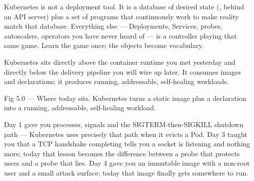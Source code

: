 \begin{keyidea}
Kubernetes is not a deployment tool. It is a database of desired state (, behind an API server) plus a set of programs that continuously work to make reality match that database. Everything else --- Deployments, Services, probes, autoscalers, operators you have never heard of --- is a controller playing that same game. Learn the game once; the objects become vocabulary.
\end{keyidea}

 Kubernetes sits directly above the container runtime you met yesterday and directly below the delivery pipeline you will wire up later. It consumes images and declarations; it produces running, addressable, self-healing workloads.

\begin{wbfigure}{Fig 5.0 — Where today sits. Kubernetes turns a static image plus a declaration into a running, addressable, self-healing workload.}
\end{wbfigure}

 Day 1 gave you processes, signals and the SIGTERM-then-SIGKILL shutdown path --- Kubernetes uses precisely that path when it evicts a Pod. Day 3 taught you that a TCP handshake completing tells you a socket is listening and nothing more; today that lesson becomes the difference between a probe that protects users and a probe that lies. Day 4 gave you an immutable image with a non-root user and a small attack surface; today that image finally gets somewhere to run.

